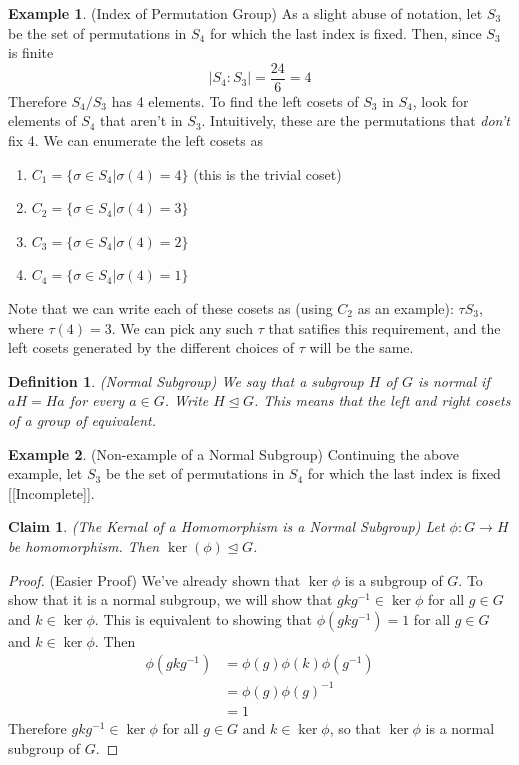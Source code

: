 \documentclass[12pt]{article}
\newtheorem{claim}{Claim}
\newtheorem{definition}{Definition}
\theoremstyle{definition}
\newtheorem{example}{Example}
\theoremstyle{definition}
\begin{document}
\begin{example}(Index of Permutation Group)
As a slight abuse of notation, let $S_3$ be the set of permutations in $S_4$ for which the last index is fixed. Then, since $S_3$ is finite
\begin{equation}
 	|S_4 : S_3| = \frac{24}{6} = 4
\end{equation} 
Therefore $S_4 / S_3$ has 4 elements. To find the left cosets of $S_3$ in $S_4$, look for elements of $S_4$ that aren't in $S_3$. Intuitively, these are the permutations that \textit{don't} fix 4. We can enumerate the left cosets as
\begin{enumerate}
	\item $C_1 = \{\sigma \in S_4 | \sigma(4) = 4 \}$ (this is the trivial coset)
	\item $C_2 = \{\sigma \in S_4 | \sigma(4) = 3 \}$
	\item $C_3 = \{\sigma \in S_4 | \sigma(4) = 2 \}$
	\item $C_4 = \{\sigma \in S_4 | \sigma(4) = 1 \}$
\end{enumerate}
Note that we can write each of these cosets as (using $C_2$ as an example): $\tau S_3$, where $\tau(4) = 3$. We can pick any such $\tau$ that satifies this requirement, and the left cosets generated by the different choices of $\tau$ will be the same.
\end{example}

\begin{definition}(Normal Subgroup)
We say that a subgroup $H$ of $G$ is normal if $aH = Ha$ for every $a \in G$. Write $H \trianglelefteq G$. This means that the left and right cosets of a group of equivalent.
\end{definition}

\begin{example}(Non-example of a Normal Subgroup)
Continuing the above example, let $S_3$ be the set of permutations in $S_4$ for which the last index is fixed [[Incomplete]].
\end{example}

\begin{claim}(The Kernal of a Homomorphism is a Normal Subgroup)
Let $\phi : G \to H$ be homomorphism. Then $\ker (\phi) \trianglelefteq G$.
\end{claim}
\begin{proof}(Easier Proof)
We've already shown that $\ker \phi$ is a subgroup of $G$. To show that it is a normal subgroup, we will show that $g k g^{-1} \in \ker \phi$ for all $g \in G$ and $k \in \ker \phi$. This is equivalent to showing that $\phi(g k g^{-1}) = 1$ for all $g \in G$ and $k \in \ker \phi$. Then
\begin{align*}
	\phi(g k g^{-1}) &= \phi(g)\phi(k)\phi(g^{-1}) \\
	&= \phi(g) \phi(g)^{-1} \\
	&= 1
\end{align*}
Therefore $g k g^{-1} \in \ker \phi$ for all $g \in G$ and $k \in \ker \phi$, so that $\ker \phi$ is a normal subgroup of $G$. 
\end{proof}
\end{document}
